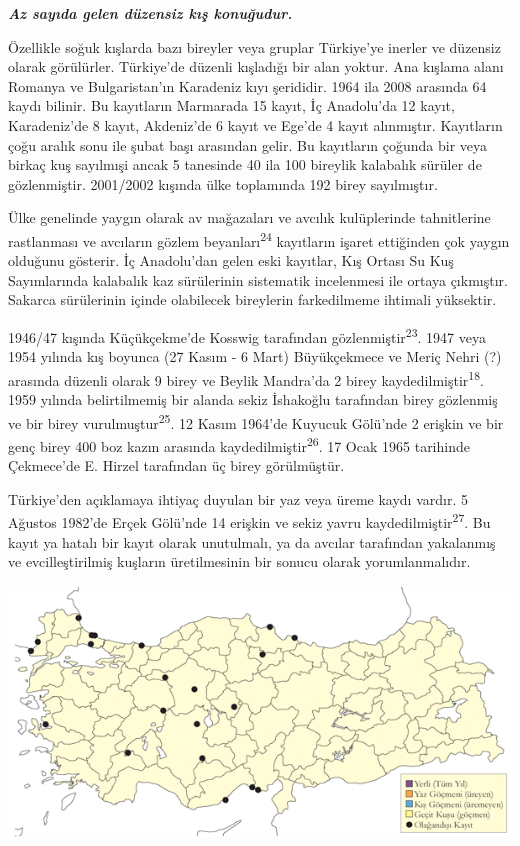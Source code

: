 \documentclass[
  letterpaper,
  DIV=11,
  numbers=noendperiod]{scrreprt}
\begin{document}
\textbf{\emph{Az sayıda gelen düzensiz kış konuğudur.}}

Özellikle soğuk kışlarda bazı bireyler veya gruplar Türkiye'ye inerler
ve düzensiz olarak görülürler. Türkiye'de düzenli kışladığı bir alan
yoktur. Ana kışlama alanı Romanya ve Bulgaristan'ın Karadeniz kıyı
şerididir. 1964 ila 2008 arasında 64 kaydı bilinir. Bu kayıtların
Marmarada 15 kayıt, İç Anadolu'da 12 kayıt, Karadeniz'de 8 kayıt,
Akdeniz'de 6 kayıt ve Ege'de 4 kayıt alınmıştır. Kayıtların çoğu aralık
sonu ile şubat başı arasından gelir. Bu kayıtların çoğunda bir veya
birkaç kuş sayılmışi ancak 5 tanesinde 40 ila 100 bireylik kalabalık
sürüler de gözlenmiştir. 2001/2002 kışında ülke toplamında 192 birey
sayılmıştır.

Ülke genelinde yaygın olarak av mağazaları ve avcılık kulüplerinde
tahnitlerine rastlanması ve avcıların gözlem
beyanları\textsuperscript{24} kayıtların işaret ettiğinden çok yaygın
olduğunu gösterir. İç Anadolu'dan gelen eski kayıtlar, Kış Ortası Su Kuş
Sayımlarında kalabalık kaz sürülerinin sistematik incelenmesi ile ortaya
çıkmıştır. Sakarca sürülerinin içinde olabilecek bireylerin farkedilmeme
ihtimali yüksektir.

1946/47 kışında Küçükçekme'de Kosswig tarafından
gözlenmiştir\textsuperscript{23}. 1947 veya 1954 yılında kış boyunca (27
Kasım - 6 Mart) Büyükçekmece ve Meriç Nehri (?) arasında düzenli olarak
9 birey ve Beylik Mandra'da 2 birey kaydedilmiştir\textsuperscript{18}.
1959 yılında belirtilmemiş bir alanda sekiz İshakoğlu tarafından birey
gözlenmiş ve bir birey vurulmuştur\textsuperscript{25}. 12 Kasım 1964'de
Kuyucuk Gölü'nde 2 erişkin ve bir genç birey 400 boz kazın arasında
kaydedilmiştir\textsuperscript{26}. 17 Ocak 1965 tarihinde Çekmece'de E.
Hirzel tarafından üç birey görülmüştür.

Türkiye'den açıklamaya ihtiyaç duyulan bir yaz veya üreme kaydı vardır.
5 Ağustos 1982'de Erçek Gölü'nde 14 erişkin ve sekiz yavru
kaydedilmiştir\textsuperscript{27}. Bu kayıt ya hatalı bir kayıt olarak
unutulmalı, ya da avcılar tarafından yakalanmış ve evcilleştirilmiş
kuşların üretilmesinin bir sonucu olarak yorumlanmalıdır.

\includegraphics{images/harita_Page_007.png}
\end{document}
